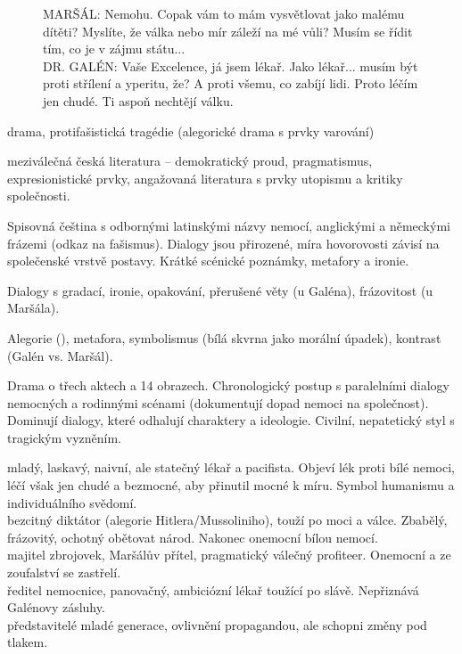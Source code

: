 \documentclass[FGBook.tex]{subfiles}
\begin{document}

\noindent\begin{figure}\footnotesize
{}
\setlength{\parindent}{3pt}
MARŠÁL: Nemohu. Copak vám to mám vysvětlovat jako malému dítěti? Myslíte, že válka nebo mír záleží na mé vůli? Musím se řídit tím, co je v zájmu státu...\\
DR. GALÉN: Vaše Excelence, já jsem lékař. Jako lékař... musím být proti střílení a yperitu, že? A proti všemu, co zabíjí lidi. Proto léčím jen chudé. Ti aspoň nechtějí válku.
\end{figure}


\noindent drama, protifašistická tragédie (alegorické drama s prvky varování)

\noindent meziválečná česká literatura -- demokratický proud, pragmatismus, expresionistické prvky, angažovaná literatura s prvky utopismu a kritiky společnosti.

\noindent Spisovná čeština s odbornými latinskými názvy nemocí, anglickými a německými frázemi (odkaz na fašismus). Dialogy jsou přirozené, míra hovorovosti závisí na společenské vrstvě postavy. Krátké scénické poznámky, metafory a ironie.

\noindent Dialogy s gradací, ironie, opakování, přerušené věty (u Galéna), frázovitost (u Maršála).

\noindent Alegorie (), metafora, symbolismus (bílá skvrna jako morální úpadek), kontrast (Galén vs. Maršál).

\noindent Drama o třech aktech a 14 obrazech. Chronologický postup s paralelními dialogy nemocných a rodinnými scénami (dokumentují dopad nemoci na společnost). Dominují dialogy, které odhalují charaktery a ideologie. Civilní, nepatetický styl s tragickým vyzněním.

\noindent 
{} mladý, laskavý, naivní, ale statečný lékař a pacifista. Objeví lék proti bílé nemoci, léčí však jen chudé a bezmocné, aby přinutil mocné k míru. Symbol humanismu a individuálního svědomí.\\
 bezcitný diktátor (alegorie Hitlera/Mussoliniho), touží po moci a válce. Zbabělý, frázovitý, ochotný obětovat národ. Nakonec onemocní bílou nemocí.\\
 majitel zbrojovek, Maršálův přítel, pragmatický válečný profiteer. Onemocní a ze zoufalství se zastřelí.\\
 ředitel nemocnice, panovačný, ambiciózní lékař toužící po slávě. Nepřiznává Galénovy zásluhy.\\
 představitelé mladé generace, ovlivnění propagandou, ale schopni změny pod tlakem.
\end{document}
